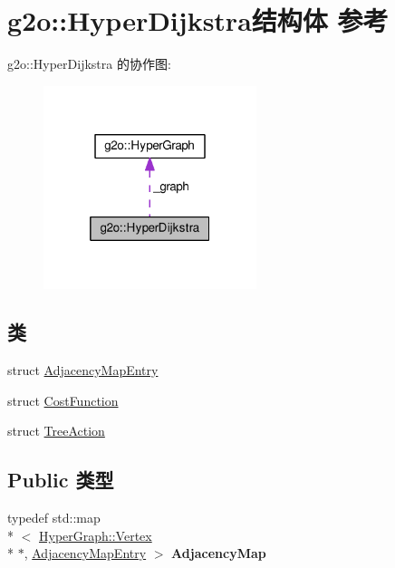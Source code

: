 \hypertarget{structg2o_1_1HyperDijkstra}{\section{g2o\-:\-:Hyper\-Dijkstra结构体 参考}
\label{structg2o_1_1HyperDijkstra}
}


g2o\-:\-:Hyper\-Dijkstra 的协作图\-:
\nopagebreak
\begin{figure}[H]
\begin{center}
\leavevmode
\includegraphics[width=176pt]{structg2o_1_1HyperDijkstra__coll__graph}
\end{center}
\end{figure}
\subsection*{类}
\begin{DoxyCompactItemize}
\item 
struct \hyperlink{structg2o_1_1HyperDijkstra_1_1AdjacencyMapEntry}{Adjacency\-Map\-Entry}
\item 
struct \hyperlink{structg2o_1_1HyperDijkstra_1_1CostFunction}{Cost\-Function}
\item 
struct \hyperlink{structg2o_1_1HyperDijkstra_1_1TreeAction}{Tree\-Action}
\end{DoxyCompactItemize}
\subsection*{Public 类型}
\begin{DoxyCompactItemize}
\item 
\hypertarget{structg2o_1_1HyperDijkstra_af12ff8eef95094815a3fa1da0514bda2}{typedef std\-::map\\*
$<$ \hyperlink{classg2o_1_1HyperGraph_1_1Vertex}{Hyper\-Graph\-::\-Vertex} \\*
$\ast$, \hyperlink{structg2o_1_1HyperDijkstra_1_1AdjacencyMapEntry}{Adjacency\-Map\-Entry} $>$ {\bfseries Adjacency\-Map}}\label{structg2o_1_1HyperDijkstra_af12ff8eef95094815a3fa1da0514bda2}

\end{DoxyCompactItemize}
